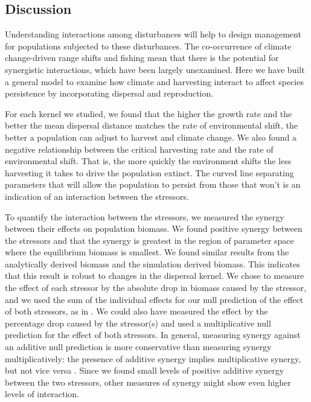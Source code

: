\documentclass[12pt,english]{article}
\begin{document}
\begin{spacing}{1.9}
\begin{flushleft}
\section{Discussion}

Understanding interactions among disturbances will help to design management for populations subjected to these disturbances. The co-occurrence of climate change-driven range shifts and fishing mean that there is the potential for synergistic interactions, which have been largely unexamined.  Here we have built a general model to examine how climate and harvesting interact to affect species persistence by incorporating dispersal and reproduction. 

For each kernel we studied, we found that the higher the growth rate and the better the mean dispersal distance matches the rate of environmental shift, the better a population can adjust to harvest and climate change.  We also found a negative relationship between the critical harvesting rate and the rate of environmental shift.  That is, the more quickly the environment shifts the less harvesting it takes to drive the population extinct.  The curved line separating parameters that will allow the population to persist from those that won't is an indication of an interaction between the stressors.

To quantify the interaction between the stressors, we measured the synergy between their effects on population biomass.  We found positive synergy between the stressors and that the synergy is greatest in the region of parameter space where the equilibrium biomass is smallest.  We found similar results from the analytically derived biomass and the simulation derived biomass. This indicates that this result is robust to changes in the dispersal kernel.  We chose to measure the effect of each stressor by the absolute drop in biomass caused by the stressor, and we used the sum of the individual effects for our null prediction of the effect of both stressors, as in \cite{Crainetal2008, DarlingCote2008,Nyeetal2013}.  We could also have measured the effect by the percentage drop caused by the stressor(s) and used a multiplicative null prediction for the effect of both stressors.  In general, measuring synergy against an additive null prediction is more conservative than measuring synergy multiplicatively: the presence of additive synergy implies multiplicative synergy, but not vice versa \citep{Crainetal2008, Foltetal1999}.  Since we found small levels of positive additive synergy between the two stressors, other measures of synergy might show even higher levels of interaction. 


\end{flushleft}
\end{spacing}
\end{document}
